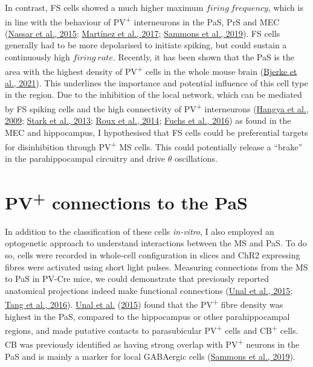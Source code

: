 \documentclass[
  12pt,
  a4paper,
  openany]{book}
\begin{document}
In contrast, FS cells showed a much higher maximum \(firing\ frequency\), which is in line with the behaviour of PV\textsuperscript{+} interneurons in the PaS, PrS and MEC (\protect\hyperlink{ref-nassar_diversity_2015}{Nassar et al., 2015}; \protect\hyperlink{ref-martinez_anatomical_2017}{Martínez et al., 2017}; \protect\hyperlink{ref-sammons_electrophysiological_2019}{Sammons et al., 2019}). FS cells generally had to be more depolarised to initiate spiking, but could sustain a continuously high \(firing\ rate\). Recently, it has been shown that the PaS is the area with the highest density of PV\textsuperscript{+} cells in the whole mouse brain (\protect\hyperlink{ref-bjerke_densities_2021}{Bjerke et al., 2021}). This underlines the importance and potential influence of this cell type in the region. Due to the inhibition of the local network, which can be mediated by FS spiking cells and the high connectivity of PV\textsuperscript{+} interneurons (\protect\hyperlink{ref-hangya_gabaergic_2009}{Hangya et al., 2009}; \protect\hyperlink{ref-stark_inhibition-induced_2013}{Stark et al., 2013}; \protect\hyperlink{ref-roux_vivo_2014}{Roux et al., 2014}; \protect\hyperlink{ref-fuchs_local_2016}{Fuchs et al., 2016}) as found in the MEC and hippocampus, I hypothesised that FS cells could be preferential targets for disinhibition through PV\textsuperscript{+} MS cells. This could potentially release a ``brake'' in the parahippocampal circuitry and drive \(\theta\) oscillations.

\hypertarget{pv-connections-to-the-pas}{%
\section{\texorpdfstring{PV\textsuperscript{+} connections to the PaS}{PV+ connections to the PaS}}\label{pv-connections-to-the-pas}}

In addition to the classification of these cells \emph{in-vitro}, I also employed an optogenetic approach to understand interactions between the MS and PaS. To do so, cells were recorded in whole-cell configuration in slices and ChR2 expressing fibres were activated using short light pulses. Measuring connections from the MS to PaS in PV-Cre mice, we could demonstrate that previously reported anatomical projections indeed make functional connections (\protect\hyperlink{ref-unal_synaptic_2015}{Unal et al., 2015}; \protect\hyperlink{ref-tang_functional_2016}{Tang et al., 2016}). \protect\hyperlink{ref-unal_synaptic_2015}{Unal et al.} (\protect\hyperlink{ref-unal_synaptic_2015}{2015}) found that the PV\textsuperscript{+} fibre density was highest in the PaS, compared to the hippocampus or other parahippocampal regions, and made putative contacts to parasubicular PV\textsuperscript{+} cells and CB\textsuperscript{+} cells. CB was previously identified as having strong overlap with PV\textsuperscript{+} neurons in the PaS and is mainly a marker for local GABAergic cells (\protect\hyperlink{ref-sammons_electrophysiological_2019}{Sammons et al., 2019}).
\end{document}
